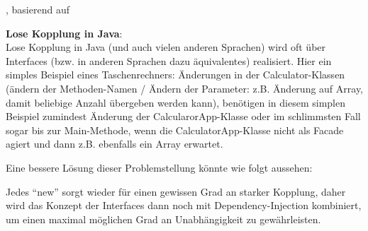 \medskip
\noindent\autocite[vgl.][]{loosecoupling_reconceptualization}, basierend auf \autocite[vgl.][S. 101ff]{meilir_loosecoupling}
\medskip

\textbf{Lose Kopplung in Java}: \\
Lose Kopplung in Java (und auch vielen anderen Sprachen) wird oft über Interfaces (bzw. in anderen Sprachen dazu äquivalentes) realisiert. Hier ein simples Beispiel eines Taschenrechners:
Änderungen in der Calculator-Klassen (ändern der Methoden-Namen / Ändern der Parameter: z.B. Änderung auf Array, damit beliebige Anzahl übergeben werden kann), benötigen in diesem simplen Beispiel zumindest Änderung der CalcularorApp-Klasse oder im schlimmsten Fall sogar bis zur Main-Methode, wenn die CalculatorApp-Klasse nicht als Facade agiert und dann z.B. ebenfalls ein Array erwartet.

Eine bessere Lösung dieser Problemstellung könnte wie folgt aussehen:

Jedes \enquote{new} sorgt wieder für einen gewissen Grad an starker Kopplung, daher wird das Konzept der Interfaces dann noch mit Dependency-Injection kombiniert, um einen maximal möglichen Grad an Unabhängigkeit zu gewährleisten.
\newpage
% 
